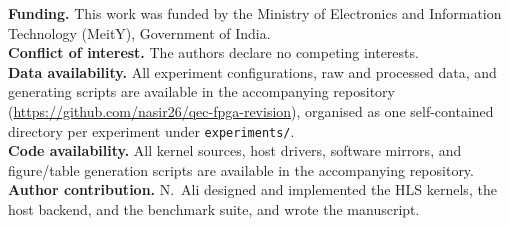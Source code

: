 \documentclass[pdflatex,sn-mathphys-num]{sn-jnl}
\theoremstyle{thmstyleone}
\theoremstyle{thmstyletwo}
\theoremstyle{thmstylethree}
\begin{document}
\textbf{Funding.} This work was funded by the Ministry of Electronics and Information Technology (MeitY), Government of India.\\
\textbf{Conflict of interest.} The authors declare no competing interests.\\
\textbf{Data availability.} All experiment configurations, raw and processed data, and generating scripts are available in the accompanying repository (\url{https://github.com/nasir26/qec-fpga-revision}), organised as one self-contained directory per experiment under \texttt{experiments/}.\\
\textbf{Code availability.} All kernel sources, host drivers, software mirrors, and figure/table generation scripts are available in the accompanying repository.\\
\textbf{Author contribution.} N.~Ali designed and implemented the HLS kernels, the host backend, and the benchmark suite, and wrote the manuscript.



\appendix

\end{document}
